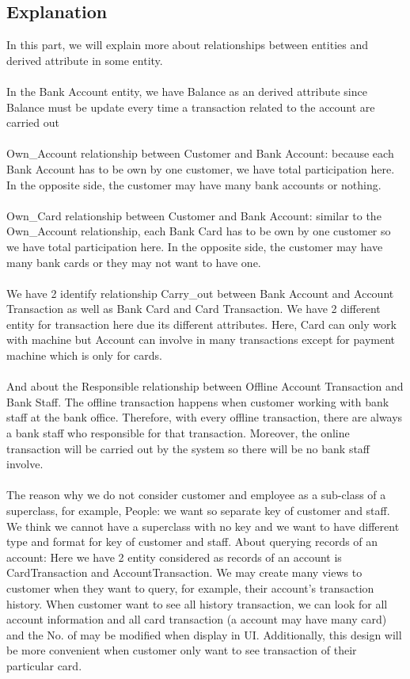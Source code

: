 \documentclass[12pt,a4paper]{article}
\begin{document}
\subsection{Explanation}
\indent In this part, we will explain more about relationships between entities and derived attribute in some entity.\\\\
\indent In the Bank Account entity, we have Balance as an derived attribute since Balance must be update every time a transaction related to the account are carried out\\\\
\indent Own\_Account relationship between Customer and Bank Account: because each Bank Account has to be own by one customer, we have total participation here. In the opposite side, the customer may have many bank accounts or nothing.\\\\
\indent Own\_Card relationship between Customer and Bank Account: similar to the Own\_Account relationship, each Bank Card has to be own by one customer so we have total participation here. In the opposite side, the customer may have many bank cards or they may not want to have one.\\\\
\indent We have 2 identify relationship Carry\_out between Bank Account and Account Transaction as well as Bank Card and Card Transaction. We have 2 different entity for transaction here due its different attributes. Here, Card can only work with machine but Account can involve in many transactions except for payment machine which is only for cards.\\\\
\indent And about the Responsible relationship between Offline Account Transaction and Bank Staff. The offline transaction happens when customer working with bank staff at the bank office. Therefore, with every offline transaction, there are always a bank staff who responsible for that transaction. Moreover, the online transaction will be carried out by the system so there will be no bank staff involve.\\\\
\indent The reason why we do not consider customer and employee as a sub-class of a superclass, for example, People: we want so separate key of customer and staff. We think we cannot have a superclass with no key and we want to have different type and format for key of customer and staff. 
\indent About querying records of an account: Here we have 2 entity considered as records of an account is CardTransaction and AccountTransaction. We may create many views to customer when they want to query, for example, their account's transaction history. When customer want to see all history transaction, we can look for all account information and all card transaction (a account may have many card) and the No. of may be modified when display in UI. Additionally, this design will be more convenient when customer only want to see transaction of their particular card.
\end{document}
